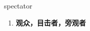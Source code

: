 
\begin{frame}
{\huge spectator}
\begin{center}
\begin{enumerate}\Large
  \item \textbf{观众，目击者，旁观者}
\end{enumerate}
\end{center}
\end{frame}
